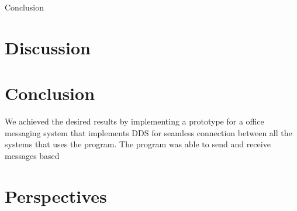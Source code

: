 {Conclusion}
\section{Discussion}


\section{Conclusion}
We achieved the desired results by implementing a prototype for a office messaging system that implements DDS for seamless connection between all the systems that uses the program.
The program was able to send and receive messages based

\section{Perspectives}

